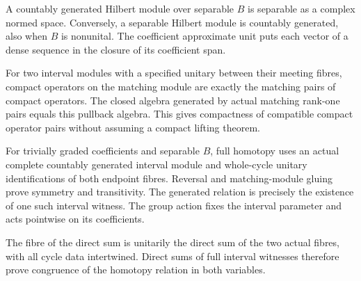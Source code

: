 \begin{proposition}\label{prop:module-separability-countable-generation}
\leanok
A countably generated Hilbert module over separable $B$ is separable as a
complex normed space. Conversely, a separable Hilbert module is countably
generated, also when $B$ is nonunital. The coefficient approximate unit puts
each vector of a dense sequence in the closure of its coefficient span.
\end{proposition}

\begin{proposition}\label{prop:matched-module-compact-pullback}
\leanok
For two interval modules with a specified unitary between their meeting
fibres, compact operators on the matching module are exactly the matching
pairs of compact operators. The closed algebra generated by actual matching
rank-one pairs equals this pullback algebra. This gives compactness of
compatible compact operator pairs without assuming a compact lifting theorem.
\end{proposition}

\begin{proposition}\label{prop:full-interval-homotopy-relation}
\leanok
For trivially graded coefficients and separable $B$, full homotopy uses an
actual complete countably generated interval module and whole-cycle unitary
identifications of both endpoint fibres. Reversal and matching-module gluing
prove symmetry and transitivity. The generated relation is precisely the
existence of one such interval witness. The group action fixes the interval
parameter and acts pointwise on its coefficients.
\end{proposition}

\begin{proposition}\label{prop:full-homotopy-direct-sums}
\leanok
The fibre of the direct sum is unitarily the direct sum of the two actual
fibres, with all cycle data intertwined. Direct sums of full interval
witnesses therefore prove congruence of the homotopy relation in both variables.
\end{proposition}

